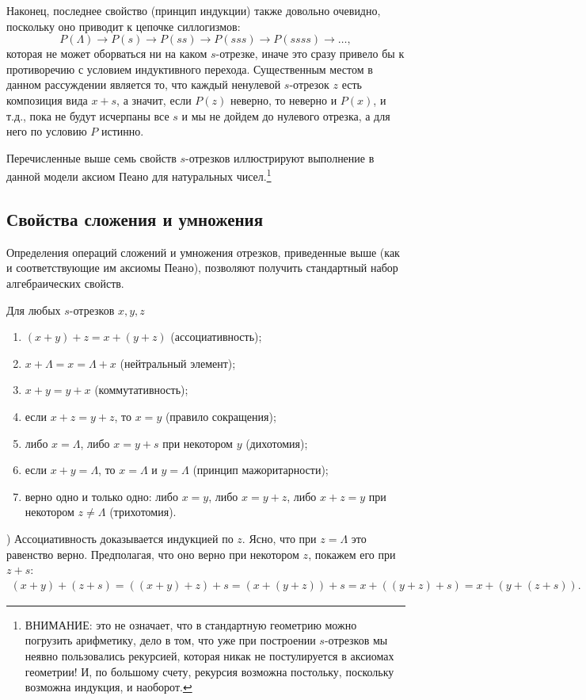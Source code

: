 Наконец, последнее свойство (принцип индукции) также довольно очевидно, поскольку оно приводит к цепочке силлогизмов:
$$
P(\Lambda)\to P(s)\to P(ss)\to P(sss)\to P(ssss)\to\dots,
$$
которая не может оборваться ни на каком $s$-отрезке, иначе это сразу привело бы к противоречию с условием индуктивного перехода. Существенным местом в данном рассуждении является то, что каждый ненулевой $s$-отрезок $z$ есть композиция вида $x+s$, а значит, если $P(z)$ неверно, то неверно и $P(x)$, и т.д., пока не будут исчерпаны все $s$ и мы не дойдем до нулевого отрезка, а для него по условию $P$ истинно.

Перечисленные выше семь свойств $s$-отрезков иллюстрируют выполнение в данной модели аксиом Пеано для натуральных чисел.\footnote{ВНИМАНИЕ: это не означает, что в стандартную геометрию можно погрузить арифметику, дело в том, что уже при построении $s$-отрезков мы неявно пользовались рекурсией, которая никак не постулируется в аксиомах геометрии! И, по большому счету, рекурсия возможна постольку, поскольку возможна индукция, и наоборот.}



\subsection{Свойства сложения и умножения}

Определения операций сложений и умножения отрезков, приведенные выше (как и соответствующие им аксиомы Пеано), позволяют получить стандартный набор алгебраических свойств.

\begin{thrm}\label{Summ} Для любых $s$-отрезков $x,y,z$
\begin{enumerate}[S1]
\item $(x+y)+z=x+(y+z)$ (ассоциативность);
\item $x+\Lambda=x=\Lambda+x$ (нейтральный элемент);
\item $x+y=y+x$ (коммутативность);
\item если $x+z=y+z$, то $x=y$ (правило сокращения);
\item либо $x=\Lambda$, либо $x=y+s$ при некотором $y$ (дихотомия);
\item если $x+y=\Lambda$, то $x=\Lambda$ и $y=\Lambda$ (принцип мажоритарности);
\item верно одно и только одно: либо $x=y$, либо $x=y+z$, либо $x+z=y$ при некотором $z\ne\Lambda$ (трихотомия).
\end{enumerate}
\end{thrm}
) Ассоциативность доказывается индукцией по $z$. Ясно, что при $z=\Lambda$ это равенство верно.
Предполагая, что оно верно при некотором $z$, покажем его при $z+s$:
\begin{multline*}
(x+y)+(z+s) = ((x+y)+z)+s = (x+(y+z))+s = x+((y+z)+s) = x+(y+(z+s)).
\end{multline*}

